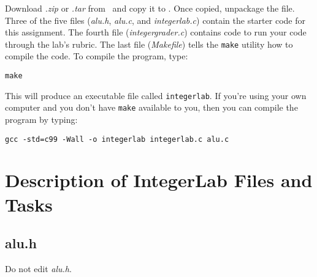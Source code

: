 Download \textit{\shortlabname.zip} or \textit{\shortlabname.tar} from
\filesource\ and copy it to \runtimeenvironment. Once copied, unpackage the
file. Three of the five files (\textit{alu.h}, \textit{alu.c}, and
\textit{integerlab.c}) contain the starter code for this assignment. The fourth
file (\textit{integergrader.c}) contains code to run your code through the lab's
rubric. The last file (\textit{Makefile}) tells the \texttt{make} utility how
to compile the code. To compile the program, type:

\texttt{make}

This will produce an executable file called \texttt{integerlab}.  If you're
using your own computer and you don't have \texttt{make} available to you, then
you can compile the program by typing:

\texttt{gcc -std=c99 -Wall -o integerlab integerlab.c alu.c}

\section{Description of IntegerLab Files and Tasks}

\subsection{alu.h}

Do not edit \textit{alu.h}.

